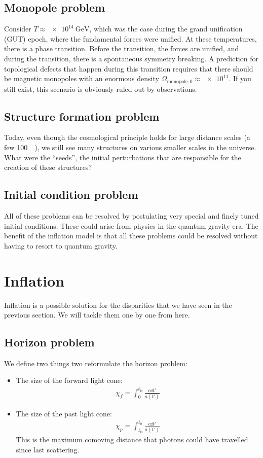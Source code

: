 \subsection{Monopole problem}
Consider $T \approx \SI{e14}{\GeV}$, which was the case during the grand unification (GUT) epoch, where the fundamental forces were unified. At these temperatures, there is a phase transition. Before the transition, the forces are unified, and during the transition, there is a spontaneous symmetry breaking. A prediction for topological defects that happen during this transition requires that there should be magnetic monopoles with an enormous density $\Omega_{\text{monopole},0} \approx \num{e11}$. If you still exist, this scenario is obviously ruled out by observations.

\subsection{Structure formation problem}
Today, even though the cosmological principle holds for large distance scales (a few \SI{100}{\mega\parsec}), we still see many structures on various smaller scales in the universe. What were the \enquote{seeds}, the initial perturbations that are responsible for the creation of these structures?

\subsection{Initial condition problem}
All of these problems can be resolved by postulating very special and finely tuned initial conditions. These could arise from physics in the quantum gravity era. The benefit of the inflation model is that all these problems could be resolved without having to resort to quantum gravity.




\section{Inflation}

Inflation is a possible solution for the disparities that we have seen in the previous section. We will tackle them one by one from here.

\subsection{Horizon problem}
We define two things two reformulate the horizon problem:
\begin{itemize}
	\item The size of the forward light cone:
	\begin{align*}
		\chi_f = \int_0 ^{t_\text{ls}} \frac{c \dd{t'}}{a(t')}
	\end{align*}
	\item The size of the past light cone:
	\begin{align*}
		\chi_p = \int_{t_\text{ls}}^{t_0} \frac{c \dd{t'}}{a(t')}
	\end{align*}
	This is the maximum comoving distance that photons could have travelled since last scattering.
\end{itemize}

